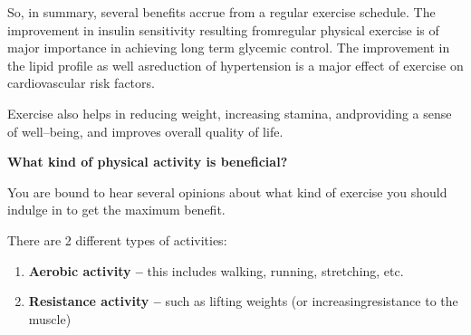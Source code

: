 So, in summary, several benefits accrue from a regular exercise schedule. The improvement in insulin sensitivity resulting from\break regular physical exercise is of major importance in achieving long term glycemic control. The improvement in the lipid profile as well as\break reduction of hypertension is a major effect of exercise on cardio\-va\-scular risk factors.

Exercise also helps in reducing weight, increasing stamina, and\break providing a sense of well–being, and improves overall quality of life.

\noindent\textbf{What kind of physical activity is beneficial?}

You are bound to hear several opinions about what kind of exercise you should indulge in to get the maximum benefit.

\noindent There are 2 different types of activities:

\vspace{-\topsep}
\begin{enumerate}
\itemsep=0pt
\item \textbf{Aerobic activity –} this includes walking, running, stretching, etc.
\item \textbf{Resistance activity –} such as lifting weights (or increasing\break resistance to the muscle)
\end{enumerate}
\vspace{-\topsep}

